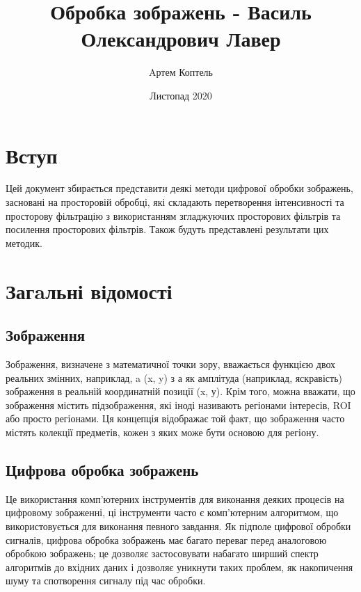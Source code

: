 \documentclass{article}
\title{Обробка зображень - Василь Олександрович Лавер}
\author{Aртем Коптель }
\date{Листопад 2020}
\begin{document}
\maketitle

\tableofcontents

\section{Вступ}\label{sec:intro}

Цей документ збирається представити деякі методи цифрової обробки зображень, засновані на просторовій обробці,
які складають перетворення інтенсивності та просторову фільтрацію з використанням згладжуючих просторових фільтрів
та посилення просторових фільтрів.
Також будуть представлені результати цих методик.

\section{Загaльні відомості}\label{sec:general}

\subsection{Зображення}\label{subsec:image}
Зображення, визначене з математичної точки зору, вважається функцією двох реальних змінних, наприклад,
a (x, y) з а як амплітуда (наприклад, яскравість) зображення в реальній координатній позиції (x, у).
Крім того, можна вважати, що зображення містить підзображення, які іноді називають регіонами інтересів,
ROI або просто регіонами.
Ця концепція відображає той факт, що зображення часто містять колекції предметів, кожен з яких може бути основою для регіону.

\subsection{Цифрова обробка зображень}\label{subsec:image_preprocessing}
Це використання комп’ютерних інструментів для виконання деяких процесів на цифровому зображенні, ці інструменти часто
є комп’ютерним алгоритмом, що використовується для виконання певного завдання.
Як підполе цифрової обробки сигналів, цифрова обробка зображень має багато переваг перед аналоговою обробкою зображень;
це дозволяє застосовувати набагато ширший спектр алгоритмів до вхідних даних і дозволяє уникнути таких проблем,
як накопичення шуму та спотворення сигналу під час обробки.
\end{document}
